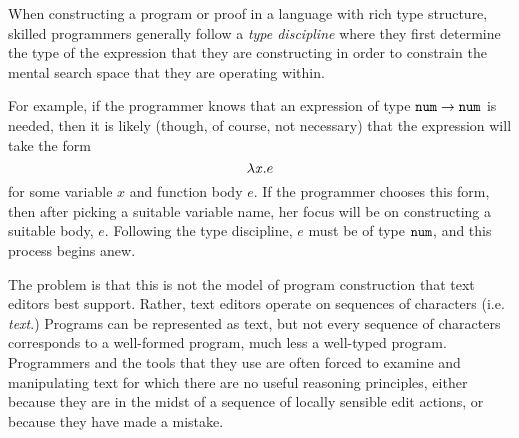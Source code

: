 



When constructing a program or proof in a language with rich type
structure, skilled programmers generally follow a \emph{type discipline}
where they first determine the type of the expression that they are
constructing in order to constrain the mental search space that they are
operating within.

For example, if the programmer knows that an expression of type
$\texttt{num} \rightarrow \texttt{num}$ is needed, then it is likely (though, of course, not
necessary) that the expression will take the form $$\lambda \mathit{x}.e$$
for some variable $x$ and function body $e$. If the programmer chooses this
form, then after picking a suitable variable name, her focus will be on
constructing a suitable body, $e$. Following the type discipline, $e$ must
be of type $\texttt{num}$, and this process begins anew.

The problem is that this is not the model of program construction that text
editors best support.  Rather, text editors operate on sequences of
characters (i.e. \emph{text}.) Programs can be represented as text, but not
every sequence of characters corresponds to a well-formed program, much
less a well-typed program. Programmers and the tools that they use are
often forced to examine and manipulating text for which there are no useful
reasoning principles, either because they are in the midst of a sequence of
locally sensible edit actions, or because they have made a mistake.


